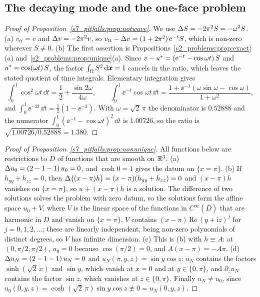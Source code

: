\subsection{The decaying mode and the one-face problem}\label{sA_proofs:sec:pitfalls}

\begin{proof}[Proof of Proposition~\ref{s7_pitfalls:prop:notwave}]
We use $\Delta S=-2\pi^2S=-\omega^2S$.
(a) $v_{tt}=v$ and $\Delta v=-2\pi^2v$, so $v_{tt}-\Delta v=(1+2\pi^2)\,\mathrm{e}^{-t}S$, which is
non-zero wherever $S\ne0$.
(b) The first assertion is Propositions~\ref{s2_problems:prop:exact}(a)
and~\ref{s2_problems:prop:unique}(a). Since $v-u^{*}=(\mathrm{e}^{-t}-\cos\omega t)\,S$ and
$u^{*}=\cos(\omega t)\,S$, the factor $\int_\Omega S^2\,\mathrm{d}\boldsymbol{x}=1$ cancels in the ratio, which
leaves the stated quotient of time integrals. Elementary integration gives
\[
\int_0^1\cos^2\omega t\,\dd t=\frac12+\frac{\sin2\omega}{4\omega},
\qquad
\int_0^1\ee^{-t}\cos\omega t\,\dd t=\frac{1+\ee^{-1}(\omega\sin\omega-\cos\omega)}{1+\omega^2},
\]
and $\int_0^1\ee^{-2t}\,\dd t=\tfrac12(1-\ee^{-2})$.
With $\omega=\sqrt2\,\pi$ the denominator is $0.52888$ and the numerator
$\int_0^1(\ee^{-t}-\cos\omega t)^2\,\dd t$ is $1.00726$, so the ratio is
$\sqrt{1.00726/0.52888}=1.380$.
\end{proof}

\begin{proof}[Proof of Proposition~\ref{s7_pitfalls:prop:nonunique}]
All functions below are restrictions to $\overline D$ of functions that are smooth on
$\mathbb{R}^3$.
(a) $\Delta u_0=(2-1-1)\,u_0=0$, and $\cosh0=1$ gives the datum on $\{x=\pi\}$.
(b) If $h_{yy}+h_{zz}=0$, then
$\Delta\bigl((x-\pi)h\bigr)=(x-\pi)(h_{yy}+h_{zz})=0$ and $(x-\pi)h$ vanishes on $\{x=\pi\}$,
so $u+(x-\pi)h$ is a solution. The difference of two solutions solves the problem with
zero datum, so the solutions form the affine space $u_0+V$, where $V$ is the linear space
of the functions in $C^\infty(\overline D)$ that are harmonic in $D$ and vanish on
$\{x=\pi\}$. $V$ contains $(x-\pi)\,\mathrm{Re}\,(y+\mathrm{i}z)^j$ for $j=0,1,2,\dots$;
these are linearly independent, being non-zero polynomials of distinct degrees, so $V$ has
infinite dimension.
(c) This is (b) with $h\equiv A$: at $(0,\pi/2,\pi/2)$, $u_0=0$ because $\cos(\pi/2)=0$,
and $A(x-\pi)=-A\pi$.
(d) $\Delta u_N=(2-1-1)\,u_N=0$ and $u_N(\pi,y,z)=\sin y\cos z$; $u_N$ contains the factors
$\sinh(\sqrt2\,x)$ and $\sin y$, which vanish at $x=0$ and at $y\in\{0,\pi\}$, and
$\partial_zu_N$ contains the factor $\sin z$, which vanishes at $z\in\{0,\pi\}$. Finally
$u_N\ne u_0$, since $u_0(0,y,z)=\cosh(\sqrt2\,\pi)\sin y\cos z\not\equiv0=u_N(0,y,z)$.
\end{proof}
